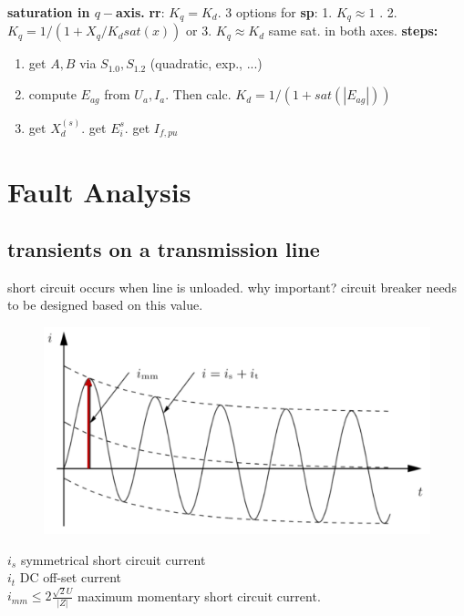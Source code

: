 \documentclass[a4paper,10pt,landscape]{scrartcl}
\begin{document}
\begin{multicols*}{3}
\vspace{-2cm}
\hspace{-2cm}
\textbf{saturation in $q-$axis.} \textbf{rr}: $K_q=K_d$.
3 options for \textbf{sp}: 1. $K_q\approx1$ . 2. $K_q=1/(1+X_q/K_d sat(x))$ or 3. $K_q\approx K_d$ same sat. in both axes.
\textbf{steps:}
\begin{enumerate}
    \item get $A,B$ via $S_{1.0},S_{1.2}$ (quadratic, exp., ...)
    \item compute $E_{ag}$ from $U_a,I_a$. Then calc. $K_d=1/(1 + sat(|E_{ag}|))$
    \item get $X_d^{(s)}$. get $E_i^{s}$. get $I_{f,pu}$
\end{enumerate}

\section{Fault Analysis}

\subsection{transients on a transmission line}
short circuit occurs when line is unloaded. why important? circuit breaker needs to be designed based on this value.
\begin{figure}
    \centering
    \includegraphics[width=\linewidth]{src/trans_line_SC.png}
\end{figure}
$i_s$ symmetrical short circuit current \\
$i_t$ DC off-set current \\
$i_{mm} \leq 2\frac{\sqrt{2}U}{|Z|}$ maximum momentary short circuit current.


\end{multicols*}
\end{document}
